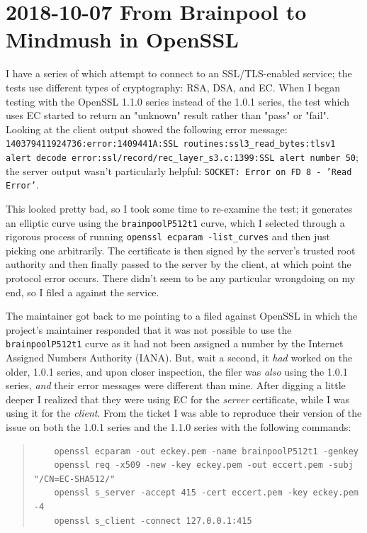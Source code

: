 \documentclass{article}
\begin{document}
\section{2018-10-07 From Brainpool to Mindmush in OpenSSL}
I\label{2019-10-07-brainpool} have a series of  which attempt to connect to an SSL/TLS-enabled service; the tests use different types of cryptography: RSA, DSA, and EC.  When I began testing with the OpenSSL 1.1.0 series instead of the 1.0.1 series, the test which uses EC started to return an "unknown" result rather than "pass" or "fail".  Looking at the client output showed the following error message: \texttt{140379411924736:error:1409441A:SSL routines:ssl3_read_bytes:tlsv1 alert decode error:ssl/record/rec_layer_s3.c:1399:SSL alert number 50}; the server output wasn't particularly helpful: \texttt{SOCKET: Error on FD 8 - 'Read Error'}.

This looked pretty bad, so I took some time to re-examine the test; it generates an elliptic curve using the \texttt{brainpoolP512t1} curve, which I selected through a rigorous process of running \texttt{openssl ecparam -list_curves} and then just picking one arbitrarily.  The certificate is then signed by the server's trusted root authority and then finally passed to the server by the client, at which point the protocol error occurs.  There didn't seem to be any particular wrongdoing on my end, so I filed a  against the service.

The maintainer got back to me pointing to a  filed against OpenSSL in which the project's maintainer responded that it was not possible to use the \texttt{brainpoolP512t1} curve as it had not been assigned a number by the Internet Assigned Numbers Authority (IANA).  But, wait a second, it \emph{had} worked on the older, 1.0.1 series, and upon closer inspection, the filer was \emph{also} using the 1.0.1 series, \emph{and} their error messages were different than mine.  After digging a little deeper I realized that they were using EC for the \emph{server} certificate, while I was using it for the \emph{client}.  From the ticket I was able to reproduce their version of the issue on both the 1.0.1 series and the 1.1.0 series with the following commands:

\begin{quote}
\begin{verbatim}
	openssl ecparam -out eckey.pem -name brainpoolP512t1 -genkey
	openssl req -x509 -new -key eckey.pem -out eccert.pem -subj "/CN=EC-SHA512/"
	openssl s_server -accept 415 -cert eccert.pem -key eckey.pem -4
	openssl s_client -connect 127.0.0.1:415
\end{verbatim}
\end{quote}
\end{document}
